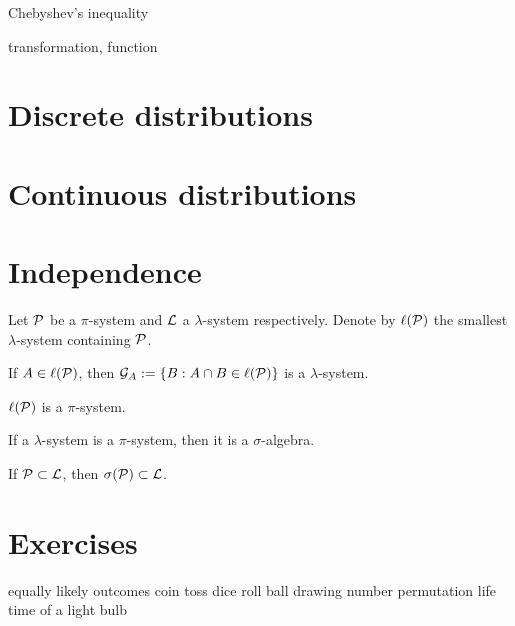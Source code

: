 \documentclass{../../large}
\begin{document}
\begin{prb}
Chebyshev's inequality
\end{prb}
\begin{prb}
\end{prb}
\begin{prb}
transformation, function
\end{prb}

\section{Discrete distributions}

\section{Continuous distributions}

\section{Independence}

\begin{prb}
Let $\mathcal{P}$ be a $\pi$-system and $\mathcal{L}$ a $\lambda$-system respectively.
Denote by $\ell(\mathcal{P})$ the smallest $\lambda$-system containing $\mathcal{P}$.
\begin{parts}
\item If $A\in\ell(\mathcal{P})$, then $\mathcal{G}_A:=\{B:A\cap B\in\ell(\mathcal{P})\}$ is a $\lambda$-system.
\item $\ell(\mathcal{P})$ is a $\pi$-system.
\item If a $\lambda$-system is a $\pi$-system, then it is a $\sigma$-algebra.
\item If $\mathcal{P}\subset\mathcal{L}$, then $\sigma(\mathcal{P})\subset\mathcal{L}$.
\end{parts}
\end{prb}

\begin{prb}

\end{prb}





\section*{Exercises}

equally likely outcomes
	coin toss
	dice roll
	ball drawing
	number permutation
	life time of a light bulb
\end{document}
